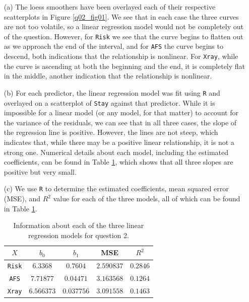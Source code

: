 \documentclass[10pt]{article}
\begin{document}
\begin{itemize}
    \item[(a)] The loess smoothers have been overlayed each of their respective scatterplots in Figure \ref{q02_fig01}. We see that in each case the three 
    curves are not too volatile, so a linear regression model would not be completely out of the question. However, for \texttt{Risk} we see that the curve 
    begins to flatten out as we approach the end of the interval, and for \texttt{AFS} the curve begins to descend, both indications that the relationship is 
    nonlinear.
    For \texttt{Xray}, while the curve is ascending at both the beginning and the end, it is completely flat in the middle, another indication that the 
    relationship is nonlinear. 
    \item[(b)] For each predictor, the linear regression model was fit using \texttt{R} and overlayed on a scatterplot of \texttt{Stay} against that predictor. 
    While it is impossible for a linear model (or any model, for that matter) to account for the variance of the residuals, we can see that in all three cases,
    the slope of the regression line is positive. However, the lines are not steep, which indicates that, while there may be a positive linear relationship,
    it is not a strong one. Numerical details about each model, including the estimated coefficients, can be found in Table \ref{q02_tab01},
    which shows that all three slopes are positive but very small.
    \item[(c)] We use \texttt{R} to determine the estimated coefficients, mean squared error (MSE), and \(R^2\) value for each of the three models, all of 
    which can be found in Table \ref{q02_tab01}. 
    \begin{table}
        \centering
        \def\arraystretch{1.25}
        \begin{tabular}[ht]{ccccc} \toprule
            \(X\) & \(b_0\) & \(b_1\) & MSE & \(R^2\) \\ \midrule
            \texttt{Risk} & \(6.3368\) & \(0.7604\) & \(2.590837\) & \(0.2846\) \\
            \texttt{AFS} & \(7.71877\) & \(0.04471\) & \(3.163568\) & \(0.1264\) \\
            \texttt{Xray} & \(6.566373\) & \(0.037756\) & \(3.091558\) & \(0.1463\) \\ \bottomrule
        \end{tabular}
        \caption{Information about each of the three linear regression models for question 2.}
        \label{q02_tab01}

\end{table}
\end{itemize}
\end{document}
